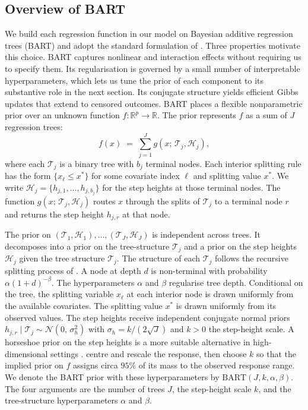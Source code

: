 \subsection{Overview of BART}

We build each regression function in our model on Bayesian additive regression trees (BART) and adopt the standard formulation of \citet{chipman2010bart}.
Three properties motivate this choice.
BART captures nonlinear and interaction effects without requiring us to specify them.
Its regularisation is governed by a small number of interpretable hyperparameters, which lets us tune the prior of each component to its substantive role in the next section.
Its conjugate structure yields efficient Gibbs updates that extend to censored outcomes.
BART places a flexible nonparametric prior over an unknown function $f : \mathbb{R}^p \to \mathbb{R}$.
The prior represents $f$ as a sum of $J$ regression trees:
\begin{equation}
f(x) \;=\;
  \sum_{j=1}^{J} g(x;\, \mathcal{T}_j, \mathcal{H}_j),
\label{eq:bart-revised}
\end{equation}
where each $\mathcal{T}_j$ is a binary tree with $b_j$ terminal nodes.
Each interior splitting rule has the form $\{x_\ell \leq x^*\}$ for some covariate index $\ell$ and splitting value $x^*$.
We write $\mathcal{H}_j = \{h_{j,1}, \ldots, h_{j,b_j}\}$ for the step heights at those terminal nodes.
The function $g(x;\, \mathcal{T}_j, \mathcal{H}_j)$ routes $x$ through the splits of $\mathcal{T}_j$ to a terminal node $r$ and returns the step height $h_{j,r}$ at that node.

The prior on $(\mathcal{T}_1, \mathcal{H}_1), \ldots, (\mathcal{T}_J, \mathcal{H}_J)$ is independent across trees.
It decomposes into a prior on the tree-structure $\mathcal{T}_j$ and a prior on the step heights $\mathcal{H}_j$ given the tree structure $\mathcal{T}_j$.
The structure of each $\mathcal{T}_j$ follows the recursive splitting process of \citet{chipman1998bayesian}.
A node at depth $d$ is non-terminal with probability $\alpha(1+d)^{-\beta}$.
The hyperparameters $\alpha$ and $\beta$ regularise tree depth.
Conditional on the tree, the splitting variable $x_\ell$ at each interior node is drawn uniformly from the available covariates.
The splitting value $x^*$ is drawn uniformly from its observed values.
The step heights receive independent conjugate normal priors $h_{j,r} \mid \mathcal{T}_j \sim \mathcal{N}(0,\, \sigma_h^2)$ with $\sigma_h = k/(2\sqrt{J})$ and $k > 0$ the step-height scale.
A horseshoe prior on the step heights is a more suitable alternative in high-dimensional settings \citep{jacobs2025horseshoe}.
\citet{chipman2010bart} centre and rescale the response, then choose $k$ so that the implied prior on $f$ assigns circa $95\%$ of its mass to the observed response range.
We denote the BART prior with these hyperparameters by $\mathrm{BART}(J, k, \alpha, \beta)$.
The four arguments are the number of trees $J$, the step-height scale $k$, and the tree-structure hyperparameters $\alpha$ and $\beta$.


